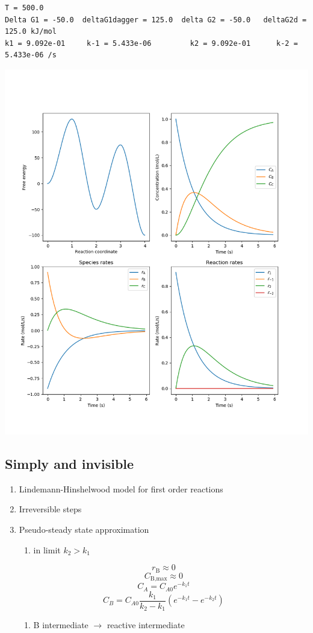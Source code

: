 \documentclass[11pt]{article}
\begin{document}
\begin{verbatim}
T = 500.0
Delta G1 = -50.0  deltaG1dagger = 125.0  delta G2 = -50.0   deltaG2d = 125.0 kJ/mol
k1 = 9.092e-01     k-1 = 5.433e-06         k2 = 9.092e-01      k-2 = 5.433e-06 /s
\end{verbatim}


\begin{center}
\includegraphics[width=.9\linewidth]{./Images/ABC-rxn.png}
\end{center}
\subsection{Simply and invisible}
\label{sec:org50cf594}
\begin{enumerate}
\item Lindemann-Hinshelwood model for first order reactions
\item Irreversible steps
\item Pseudo-steady state approximation
\begin{enumerate}
\item {} in limit \(k_2 > k_1\)
\end{enumerate}
\[ r_{\text{B}} \approx 0 \]     \[C_\text{B,max} \approx 0 \]
  \[C_A = C_{A0} e^{-k_1 t}\]    \[C_B= C_{A0}\frac{k_1}{k_2-k_1} \left ( e^{-k_1 t} - e^{-k_2 t} \right ) \]
\begin{enumerate}
\item B intermediate \(\rightarrow\) reactive intermediate
\end{enumerate}
\end{enumerate}
\end{document}
